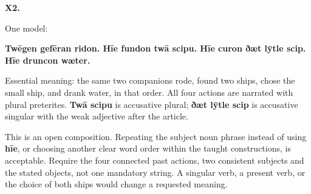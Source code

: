\par\begin{minipage}{\linewidth}\raggedright
\textbf{X2.}

One model:

\textbf{Twēgen gefēran ridon. Hīe fundon twā scipu. Hīe curon ðæt lȳtle scip. Hīe druncon wæter.}

Essential meaning: the same two companions rode, found two ships, chose the small ship, and drank water, in that order. All four actions are narrated with plural preterites. \textbf{Twā scipu} is accusative plural; \textbf{ðæt lȳtle scip} is accusative singular with the weak adjective after the article.

This is an open composition. Repeating the subject noun phrase instead of using \textbf{hīe}, or choosing another clear word order within the taught constructions, is acceptable. Require the four connected past actions, two consistent subjects and the stated objects, not one mandatory string. A singular verb, a present verb, or the choice of both ships would change a requested meaning.

\end{minipage}\par\addvspace{4pt}

